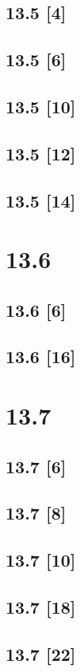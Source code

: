 \documentclass{article}
\begin{document}
\subsection*{13.5 [4]}
\subsection*{13.5 [6]}
\subsection*{13.5 [10]}
\subsection*{13.5 [12]}
\subsection*{13.5 [14]}

\newpage

\section*{13.6}
\setcounter{equation}{0}

\subsection*{13.6 [6]}
\subsection*{13.6 [16]}

\newpage

\section*{13.7}
\setcounter{equation}{0}

\subsection*{13.7 [6]}
\subsection*{13.7 [8]}
\subsection*{13.7 [10]}
\subsection*{13.7 [18]}
\subsection*{13.7 [22]}
\end{document}
